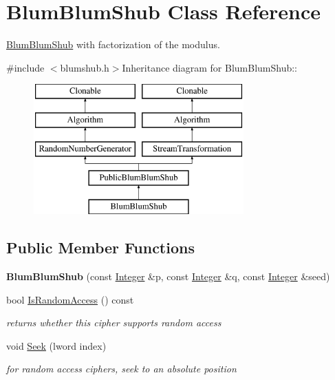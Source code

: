 \hypertarget{class_blum_blum_shub}{
\section{BlumBlumShub Class Reference}
\label{class_blum_blum_shub}
}


\hyperlink{class_blum_blum_shub}{BlumBlumShub} with factorization of the modulus.  


{\ttfamily \#include $<$blumshub.h$>$}Inheritance diagram for BlumBlumShub::\begin{figure}[H]
\begin{center}
\leavevmode
\includegraphics[height=5cm]{class_blum_blum_shub}
\end{center}
\end{figure}
\subsection*{Public Member Functions}
\begin{DoxyCompactItemize}
\item 
\hypertarget{class_blum_blum_shub_ab53b99f246235429694719d41e00b658}{
{\bfseries BlumBlumShub} (const \hyperlink{class_integer}{Integer} \&p, const \hyperlink{class_integer}{Integer} \&q, const \hyperlink{class_integer}{Integer} \&seed)}
\label{class_blum_blum_shub_ab53b99f246235429694719d41e00b658}

\item 
\hypertarget{class_blum_blum_shub_a5e84aab2ccd9f0f62445a1220e34e06b}{
bool \hyperlink{class_blum_blum_shub_a5e84aab2ccd9f0f62445a1220e34e06b}{IsRandomAccess} () const }
\label{class_blum_blum_shub_a5e84aab2ccd9f0f62445a1220e34e06b}

\begin{DoxyCompactList}\small\item\em returns whether this cipher supports random access \item\end{DoxyCompactList}\item 
\hypertarget{class_blum_blum_shub_ae29af38d625e72bc5e503db157a84c5f}{
void \hyperlink{class_blum_blum_shub_ae29af38d625e72bc5e503db157a84c5f}{Seek} (lword index)}
\label{class_blum_blum_shub_ae29af38d625e72bc5e503db157a84c5f}

\begin{DoxyCompactList}\small\item\em for random access ciphers, seek to an absolute position \item\end{DoxyCompactList}\end{DoxyCompactItemize}
